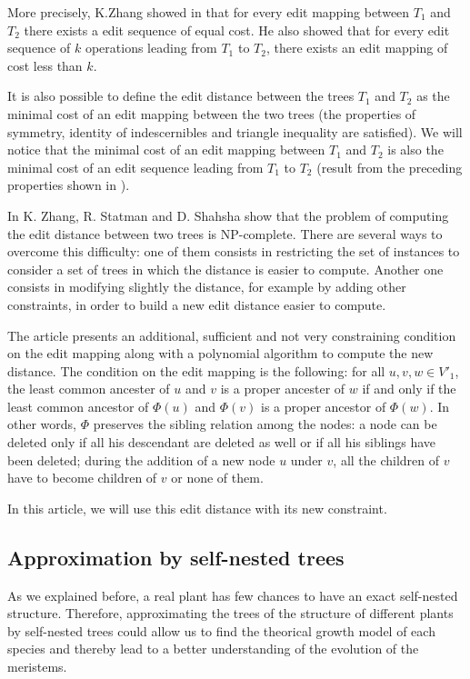 More precisely, K.Zhang showed in \cite{zhang} that for every edit
mapping between $T_{1}$ and $T_{2}$ there exists a edit sequence of
equal cost. He also showed that for every edit sequence of $k$
operations leading from $T_{1}$ to $T_{2}$, there exists an edit
mapping of cost less than $k$.

It is also possible to define the edit distance between the trees
$T_{1}$ and $T_{2}$ as the minimal cost of an edit mapping between the
two trees (the properties of symmetry, identity of indescernibles and
triangle inequality are satisfied). We will notice that the minimal
cost of an edit mapping between $T_{1}$ and $T_{2}$ is also the
minimal cost of an edit sequence leading from $T_{1}$ to $T_{2}$
(result from the preceding properties shown in \cite{zhang}). 

In \cite{NPCzhang} K. Zhang, R. Statman and D. Shahsha show that the
problem of computing the edit distance between two trees is
NP-complete. There are several ways to overcome this difficulty: one
of them consists in restricting the set of instances to consider a set
of trees in which the distance is easier to compute. Another one consists
in modifying slightly the distance, for example by adding other
constraints, in order to build a new edit distance easier to compute.

The article \cite{zhang} presents an additional, sufficient and not
very constraining condition on the edit mapping along with a
polynomial algorithm to compute the new distance. The condition on the
edit mapping is the following: for all $u,v,w \in V'_{1}$, the least
common ancester of $u$ and $v$ is a proper ancester of $w$ if and only
if the least common ancestor of $\Phi(u)$ and $\Phi(v)$ is a proper
ancestor of $\Phi(w)$. In other words, $\Phi$ preserves the sibling
relation among the nodes: a node can be deleted only if all his
descendant are deleted as well or if all his siblings have been
deleted; during the addition of a new node $u$ under $v$, all the
children of $v$ have to become children of $v$ or none of them.

In this article, we will use this edit distance with its new
constraint.

\subsection{Approximation by self-nested trees}

As we explained before, a real plant has few chances to have an exact
self-nested structure. Therefore, approximating the trees of the
structure of different plants by self-nested trees could allow us to
find the theorical growth model of each species and thereby lead to a
better understanding of the evolution of the meristems.

